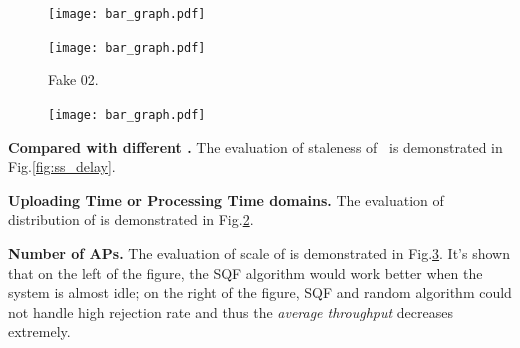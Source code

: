 
\begin{figure}[hbt]                                                 %
    \centering                                                      %
    \texttt{[image: bar\_graph.pdf]}           %
    \caption{}                                              %
    \label{fig:ss_scale}                                            %
\end{figure}                                                        %

\begin{figure}[hbt]                                                 %
    \centering                                                      %
    \texttt{[image: bar\_graph.pdf]}           %
    \caption{Fake 02.}                                              %
    \label{fig:ss_dist}                                             %
\end{figure}                                                        %

\begin{figure}[hbt]                                                 %
    \centering                                                      %
    \texttt{[image: bar\_graph.pdf]}           %
    \caption{}                                              %
    \label{fig:ss_scale}                                            %
\end{figure}                                                        %

\textbf{Compared with different \brlatency.}
The evaluation of staleness of \brlatency~is demonstrated in Fig.\ref{fig:ss_delay}.

\textbf{Uploading Time or Processing Time domains.}
The evaluation of distribution of is demonstrated in Fig.\ref{fig:ss_dist}.
\blindtext

\textbf{Number of APs.} %
The evaluation of scale of is demonstrated in Fig.\ref{fig:ss_scale}.
It's shown that on the left of the figure, the SQF algorithm would work better when the system is almost idle; on the right of the figure, SQF and random algorithm could not handle high rejection rate and thus the \emph{average throughput} decreases extremely. 


